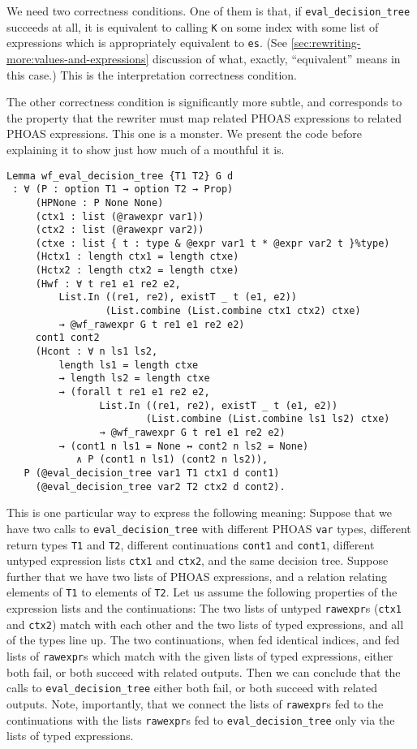 We need two correctness conditions.
One of them is that, if \texttt{eval_decision_tree} succeeds at all, it is equivalent to calling \texttt{K} on some index with some list of expressions which is appropriately equivalent to \texttt{es}.
(See \autoref{sec:rewriting-more:values-and-expressions} discussion of what, exactly, ``equivalent'' means in this case.)
This is the interpretation correctness condition.

The other correctness condition is significantly more subtle, and corresponds to the property that the rewriter must map related PHOAS expressions to related PHOAS expressions.
This one is a monster.
We present the code before explaining it to show just how much of a mouthful it is.
\begin{verbatim}
Lemma wf_eval_decision_tree {T1 T2} G d
 : ∀ (P : option T1 → option T2 → Prop)
     (HPNone : P None None)
     (ctx1 : list (@rawexpr var1))
     (ctx2 : list (@rawexpr var2))
     (ctxe : list { t : type & @expr var1 t * @expr var2 t }%type)
     (Hctx1 : length ctx1 = length ctxe)
     (Hctx2 : length ctx2 = length ctxe)
     (Hwf : ∀ t re1 e1 re2 e2,
         List.In ((re1, re2), existT _ t (e1, e2))
                 (List.combine (List.combine ctx1 ctx2) ctxe)
         → @wf_rawexpr G t re1 e1 re2 e2)
     cont1 cont2
     (Hcont : ∀ n ls1 ls2,
         length ls1 = length ctxe
         → length ls2 = length ctxe
         → (forall t re1 e1 re2 e2,
                List.In ((re1, re2), existT _ t (e1, e2))
                        (List.combine (List.combine ls1 ls2) ctxe)
                → @wf_rawexpr G t re1 e1 re2 e2)
         → (cont1 n ls1 = None ↔ cont2 n ls2 = None)
            ∧ P (cont1 n ls1) (cont2 n ls2)),
   P (@eval_decision_tree var1 T1 ctx1 d cont1)
     (@eval_decision_tree var2 T2 ctx2 d cont2).
\end{verbatim}
This is one particular way to express the following meaning:
Suppose that we have two calls to \texttt{eval_decision_tree} with different PHOAS \texttt{var} types, different return types \texttt{T1} and \texttt{T2}, different continuations \texttt{cont1} and \texttt{cont1}, different untyped expression lists \texttt{ctx1} and \texttt{ctx2}, and the same decision tree.
Suppose further that we have two lists of PHOAS expressions, and a relation relating elements of \texttt{T1} to elements of \texttt{T2}.
Let us assume the following properties of the expression lists and the continuations:
The two lists of untyped \texttt{rawexpr}s (\texttt{ctx1} and \texttt{ctx2}) match with each other and the two lists of typed expressions, and all of the types line up.
The two continuations, when fed identical indices, and fed lists of \texttt{rawexpr}s which match with the given lists of typed expressions, either both fail, or both succeed with related outputs.
Then we can conclude that the calls to \texttt{eval_decision_tree} either both fail, or both succeed with related outputs.
Note, importantly, that we connect the lists of \texttt{rawexpr}s fed to the continuations with the lists \texttt{rawexpr}s fed to \texttt{eval_decision_tree} only via the lists of typed expressions.

